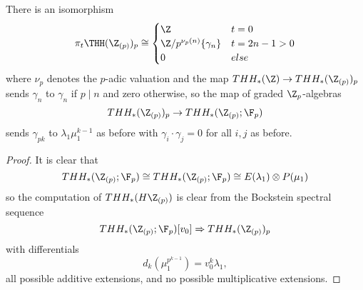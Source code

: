\begin{cor}\label{Bokmap}
There is an isomorphism 
\[
\pi_t\THH(\Z_{(p)})_p \cong \begin{cases}
		\Z & t=0\\
		\Z/p^{\nu_p(n)}\{\gamma_n\} & t=2n-1>0\\
		0 & else
	\end{cases}
\]
where $\nu_p$ denotes the $p$-adic valuation and the map $THH_*(\Z)\to THH_*(\Z_{(p)})_p$ sends $\gamma_n$ to $\gamma_n$ if $p\mid n$ and zero otherwise, so the map of graded $\Z_p$-algebras
\[ THH_*(\Z_{(p)})_p\to THH_*(\Z_{(p)};\F_p)\]
sends $\gamma_{pk}$ to $\lambda_1\mu_1^{k-1}$ as before with $\gamma_i\cdot\gamma_j=0$ for all $i,j$ as before. %
\end{cor}
\begin{proof}
It is clear that 
\[THH_*(\Z_{(p)};\F_p)\cong THH_*(\Z_{(p)};\F_p)\cong E(\lambda_1)\otimes P(\mu_1)\]
so the computation of $THH_*(H\Z_{(p)})$ is clear from the Bockstein spectral sequence 
\[THH_*(\Z_{(p)};\F_p)[v_0]\Rightarrow THH_*(\Z_{(p)})_p\]
with differentials
\[ d_k(\mu_1^{p^{k-1}})=v_0^k\lambda_1,\]
all possible additive extensions, and no possible multiplicative extensions.
\end{proof}

